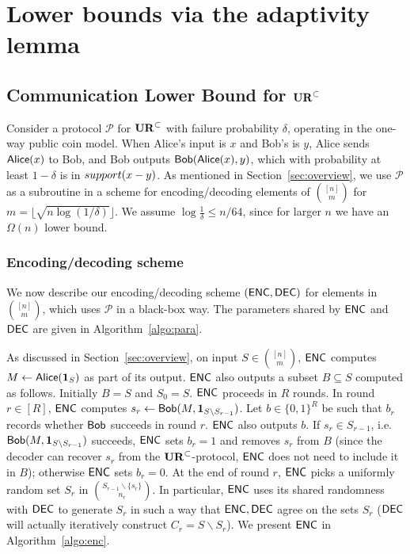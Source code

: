 \section{Lower bounds via the adaptivity lemma}\label{sec:adaptive-proof}
\subsection{Communication Lower Bound for $\mathbf{UR}^\subset$} \label{sec:optimal-lb}

Consider a protocol $\mathcal{P}$ for $\mathbf{UR}^\subset$ with failure probability $\delta$, operating in the one-way public coin model. When Alice's input is $x$ and Bob's is $y$, Alice sends $\mathsf{Alice}(x)$ to Bob, and Bob outputs $\mathsf{Bob}(\mathsf{Alice}(x), y)$, which with probability at least $1-\delta$ is in $\mathop{support}(x-y)$. As mentioned in Section~\ref{sec:overview}, we use $\mathcal{P}$ as a subroutine in a scheme for encoding/decoding elements of $\binom{[n]}m$ for $m = \lfloor \sqrt{n\log(1/\delta)}\rfloor$. We assume $\log \frac 1{\delta} \le n/64$, since for larger $n$ we have an $\Omega(n)$ lower bound.

\subsubsection{Encoding/decoding scheme}
We now describe our encoding/decoding scheme $(\textsf{ENC}, \textsf{DEC})$ for elements in ${[n] \choose m}$, which uses $\mathcal{P}$ in a black-box way. The parameters shared by $\textsf{ENC}$ and $\textsf{DEC}$ are given in Algorithm~\ref{algo:para}.

As discussed in Section~\ref{sec:overview}, on input $S\in {[n] \choose m}$, $\textsf{ENC}$ computes $M \leftarrow \mathsf{Alice}(\mathbf{1}_S)$ as part of its output. $\textsf{ENC}$ also outputs a subset $B\subseteq S$ computed as follows. Initially $B=S$ and $S_0=S$. $\textsf{ENC}$ proceeds in $R$ rounds.  In round $r\in[R]$, $\textsf{ENC}$ computes $s_r\leftarrow \mathsf{Bob}(M, \mathbf{1}_{S\backslash S_{r-1}})$.  Let $b\in\{0,1\}^R$ be such that $b_r$ records whether $\mathsf{Bob}$ succeeds in round $r$.  $\textsf{ENC}$ also outputs $b$.  If $s_r\in S_{r-1}$, i.e. $\mathsf{Bob}(M, \mathbf{1}_{S\backslash S_{r-1}})$ succeeds, $\textsf{ENC}$ sets $b_r=1$ and removes $s_r$ from $B$ (since the decoder can recover $s_r$ from the $\mathbf{UR}^\subset$-protocol, $\textsf{ENC}$ does not need to include it in $B$); otherwise $\textsf{ENC}$ sets $b_r=0$.  At the end of round $r$, $\textsf{ENC}$ picks a uniformly random set $S_r$ in $\binom{S_{r-1}\backslash \{s_r\}}{n_r}$.  In particular, $\textsf{ENC}$ uses its shared randomness with $\textsf{DEC}$ to generate $S_r$ in such a way that $\textsf{ENC}, \textsf{DEC}$ agree on the sets $S_r$ ($\textsf{DEC}$ will actually iteratively construct $C_r = S\backslash S_r$). We present $\textsf{ENC}$ in Algorithm~\ref{algo:enc}.

